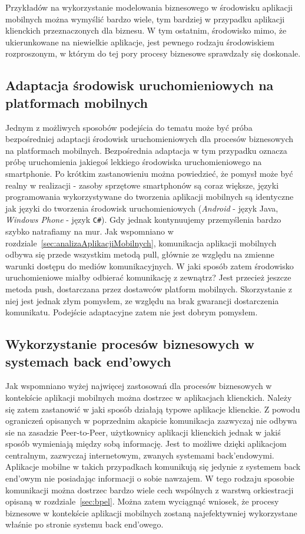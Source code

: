  Przykładów na wykorzystanie modelowania biznesowego w środowisku aplikacji mobilnych można wymyślić bardzo wiele, tym bardziej w przypadku aplikacji klienckich przeznaczonych dla biznesu. W tym ostatnim, środowisko mimo, że ukierunkowane na niewielkie aplikacje, jest pewnego rodzaju środowiskiem rozproszonym, w którym do tej pory procesy biznesowe sprawdzały się doskonale. 

\subsection{Adaptacja środowisk uruchomieniowych na platformach mobilnych}
\label{sec:adaptacjaProcesówNaPlatformyMobilne}

Jednym z możliwych sposobów podejścia do tematu może być próba bezpośredniej adaptacji środowisk uruchomieniowych dla procesów biznesowych na platformach mobilnych. Bezpośrednia adaptacja w tym przypadku oznacza próbę uruchomienia jakiegoś lekkiego środowiska uruchomieniowego na smartphonie. Po krótkim zastanowieniu można powiedzieć, że pomysł może być realny w realizacji - zasoby sprzętowe smartphonów są coraz większe, języki programowania wykorzystywane do tworzenia aplikacji mobilnych są identyczne jak języki do tworzenia środowisk uruchomieniowych (\textit{Android} - język Java, \textit{Windows Phone} - język \texttt{C\#}). Gdy jednak kontynuujemy przemyślenia bardzo szybko natrafiamy na mur. Jak wspomniano w rozdziale~\ref{sec:analizaAplikacjiMobilnych}, komunikacja aplikacji mobilnych odbywa się przede wszystkim metodą pull, głównie ze względu na zmienne warunki dostępu do mediów komunikacyjnych. W jaki sposób zatem środowisko uruchomieniowe miałby odbierać komunikację z zewnątrz? Jest przecież jeszcze metoda push, dostarczana przez dostawców platform mobilnych. Skorzystanie z niej jest jednak złym pomysłem, ze względu na brak gwarancji dostarczenia komunikatu. Podejście adaptacyjne zatem nie jest dobrym pomysłem. 


\subsection{Wykorzystanie procesów biznesowych w systemach back end'owych}
\label{sec:integracjaProcesówZAplikacjamiMobilnymi}

Jak wspomniano wyżej najwięcej zastosowań dla procesów biznesowych w kontekście aplikacji mobilnych można dostrzec w aplikacjach klienckich. Należy się zatem zastanowić w jaki sposób działają typowe aplikacje klienckie. Z powodu ograniczeń opisanych w poprzednim akapicie komunikacja zazwyczaj nie odbywa sie na zasadzie Peer-to-Peer, użytkownicy aplikacji klienckich jednak w jakiś sposób wymieniają między sobą informację. Jest to możliwe dzięki aplikacjom centralnym, zazwyczaj internetowym, zwanych systemami back'endowymi. Aplikacje mobilne w takich przypadkach komunikują się jedynie z systemem back end'owym nie posiadając informacji o sobie nawzajem. W tego rodzaju sposobie komunikacji można dostrzec bardzo wiele cech wspólnych z warstwą orkiestracji opisaną w rozdziale~\ref{sec:bpel}. Można zatem wyciągnąć wniosek, że procesy biznesowe w kontekście aplikacji mobilnych zostaną najefektywniej wykorzystane właśnie po stronie systemu back end'owego. 

